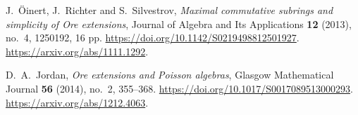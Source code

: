 J.~\"Oinert, J.~Richter and S.~Silvestrov,
\emph{Maximal commutative subrings and simplicity of Ore extensions},
Journal of Algebra and Its Applications \textbf{12} (2013), no.~4, 1250192, 16 pp.
\url{https://doi.org/10.1142/S0219498812501927}.
\url{https://arxiv.org/abs/1111.1292}.

D.~A.~Jordan, \emph{Ore extensions and Poisson algebras},
Glasgow Mathematical Journal \textbf{56} (2014), no.~2, 355--368.
\url{https://doi.org/10.1017/S0017089513000293}.
\url{https://arxiv.org/abs/1212.4063}.
